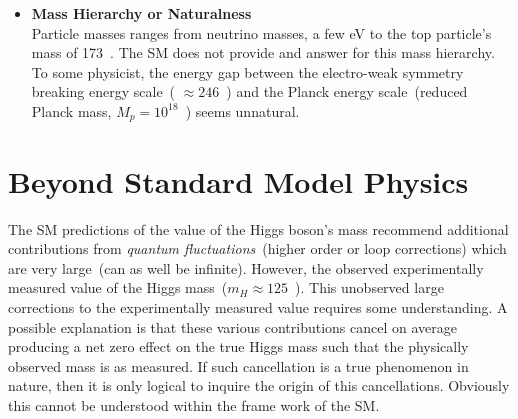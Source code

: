 \begin{itemize}
\item \textbf{Mass Hierarchy or Naturalness} \mbox{}\\
Particle masses ranges from neutrino masses, a few eV to the \textsf{top} particle's mass of 173~\GeVcc.
The SM does not provide and answer for this mass hierarchy.
To some physicist, the energy gap between the electro-weak symmetry breaking energy scale~( $\approx 246$~\GeV) and the Planck energy scale~(reduced Planck mass, $M_{p} = 10^{18}$~\GeV) seems unnatural.

\end{itemize}

\section{Beyond Standard Model Physics}
The SM predictions of the value of the Higgs boson's mass recommend additional contributions from \textit{quantum fluctuations}~(higher order or loop corrections) which are very large~(can as well be infinite). However, the observed experimentally measured value of the Higgs mass~($m_{H} \approx 125$~\GeV). This unobserved large corrections to the experimentally measured value requires some understanding. A possible explanation is that these various contributions cancel on average producing a net zero effect on the true Higgs mass such that the physically observed mass is as measured. If such cancellation is a true phenomenon in nature, then it is only logical to inquire the origin of this cancellations. Obviously this cannot be understood within the frame work of the SM. 

